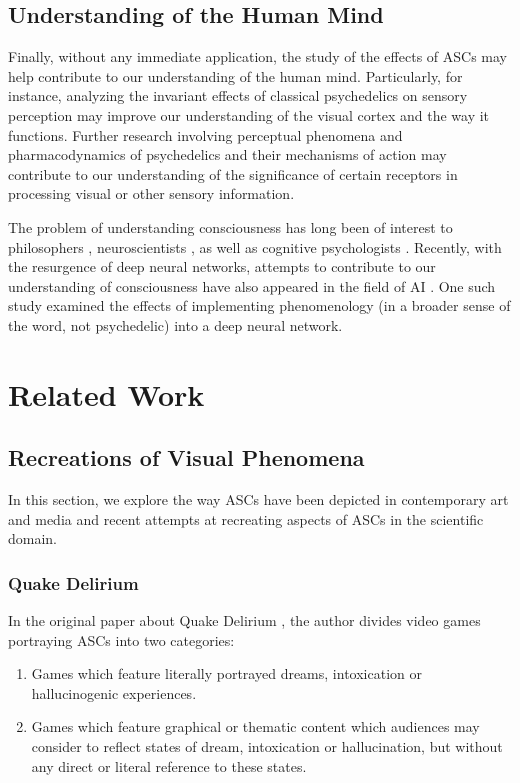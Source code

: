 \subsection{Understanding of the Human Mind}
Finally, without any immediate application, the study of the effects of \acp{ASC} may help contribute to our understanding of the human mind. Particularly, for instance, analyzing the invariant effects of classical psychedelics on sensory perception may improve our understanding of the visual cortex and the way it functions.
Further research involving perceptual phenomena and pharmacodynamics of psychedelics and their mechanisms of action may contribute to our understanding of the significance of certain receptors in processing visual or other sensory information.

The problem of understanding consciousness has long been of interest to philosophers \autocite{block1993consciousness}, neuroscientists \autocite{crick1990towards}, as well as cognitive psychologists \autocite{dehaene2014consciousness}. Recently, with the resurgence of deep neural networks, attempts to contribute to our understanding of consciousness have also appeared in the field of \ac{AI} \autocites{bengio2017consciousness}{reggia2020artificial}. One such study \autocite{bensemann2021effects} examined the effects of implementing phenomenology (in a broader sense of the word, not psychedelic) into a deep neural network.

\section{Related Work}

\subsection{Recreations of Visual Phenomena}
In this section, we explore the way \acp{ASC} have been depicted in contemporary art and media and recent attempts at recreating aspects of \acp{ASC} in the scientific domain.

\subsubsection{Quake Delirium}
In the original paper about Quake Delirium \autocite{weinel2011quake}, the author divides video games portraying \acp{ASC} into two categories:

\begin{enumerate}
    \item Games which feature literally portrayed dreams, intoxication or hallucinogenic experiences.
    \item Games which feature graphical or thematic content which audiences may consider to reflect states of dream, intoxication or hallucination, but without any direct or literal reference to these states.
\end{enumerate}

